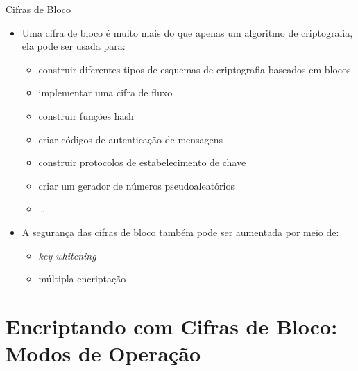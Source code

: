 \documentclass{beamer}
\begin{document}
\begin{frame}{Cifras de Bloco}

\begin{itemize}
    \item Uma cifra de bloco é muito mais do que apenas um algoritmo de criptografia, ela pode ser usada para:
    \begin{itemize}
        \item construir diferentes tipos de esquemas de criptografia baseados em blocos
        \item implementar uma cifra de fluxo
        \item construir funções hash
        \item criar códigos de autenticação de mensagens
        \item construir protocolos de estabelecimento de chave
        \item criar um gerador de números pseudoaleatórios
        \item \ldots
    \end{itemize}

    \item A segurança das cifras de bloco também pode ser aumentada por meio de:
    \begin{itemize}
        \item \textit{key whitening}
        \item múltipla encriptação
    \end{itemize}
\end{itemize}

\end{frame}


\section{Encriptando com Cifras de Bloco: Modos de Operação}
\end{document}
